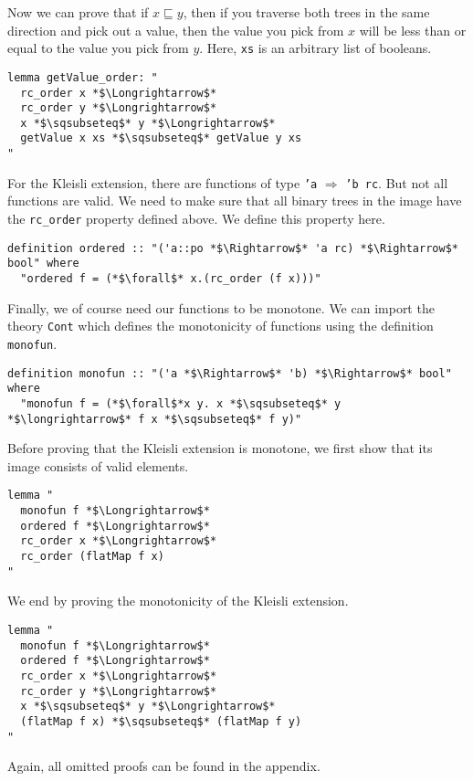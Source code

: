 Now we can prove that if $x\sqsubseteq y$, then if you traverse both trees in the same direction and pick out a value, then the value you pick from $x$ will be less than or equal to the value you pick from $y$.  Here, \texttt{xs} is an arbitrary list of booleans.
\newpage
\begin{lstlisting}[language=Isabelle]
lemma getValue_order: "
  rc_order x *$\Longrightarrow$* 
  rc_order y *$\Longrightarrow$* 
  x *$\sqsubseteq$* y *$\Longrightarrow$* 
  getValue x xs *$\sqsubseteq$* getValue y xs
"
\end{lstlisting}
For the Kleisli extension, there are functions of type \texttt{'a} $\Rightarrow$ \texttt{'b rc}.  But not all functions are valid.  We need to make sure that all binary trees in the image have the \texttt{rc\_order} property defined above.  We define this property here.
\begin{lstlisting}[language=Isabelle]
definition ordered :: "('a::po *$\Rightarrow$* 'a rc) *$\Rightarrow$* bool" where
  "ordered f = (*$\forall$* x.(rc_order (f x)))"
\end{lstlisting}
Finally, we of course need our functions to be monotone.  We can import the theory \texttt{Cont} which defines the monotonicity of functions using the definition \texttt{monofun}.
\begin{lstlisting}[language=Isabelle]
definition monofun :: "('a *$\Rightarrow$* 'b) *$\Rightarrow$* bool" where
  "monofun f = (*$\forall$*x y. x *$\sqsubseteq$* y *$\longrightarrow$* f x *$\sqsubseteq$* f y)"
\end{lstlisting}
Before proving that the Kleisli extension is monotone, we first show that its image consists of valid elements.
\begin{lstlisting}[language=Isabelle]
lemma "
  monofun f *$\Longrightarrow$*
  ordered f *$\Longrightarrow$*
  rc_order x *$\Longrightarrow$* 
  rc_order (flatMap f x)
"
\end{lstlisting}
We end by proving the monotonicity of the Kleisli extension.
\begin{lstlisting}[language=Isabelle]
lemma "
  monofun f *$\Longrightarrow$*
  ordered f *$\Longrightarrow$* 
  rc_order x *$\Longrightarrow$* 
  rc_order y *$\Longrightarrow$* 
  x *$\sqsubseteq$* y *$\Longrightarrow$* 
  (flatMap f x) *$\sqsubseteq$* (flatMap f y)
"
\end{lstlisting}
Again, all omitted proofs can be found in the appendix.

